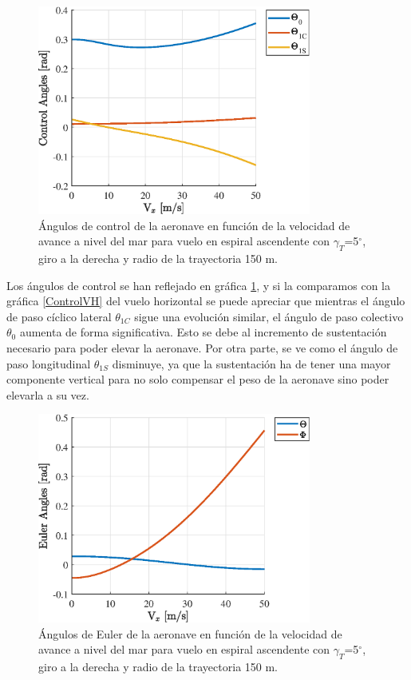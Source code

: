 \begin{figure}
	\centering
	\includegraphics[width=90mm]{graficos/ControlVE}
	\caption{Ángulos de control de la aeronave en función de la velocidad de avance a nivel del mar para vuelo en espiral ascendente con $\gamma_T$=5$^\circ$, giro a la derecha y radio de la trayectoria 150 m.}
	\label{ControlVE}
\end{figure}

Los ángulos de control se han reflejado en gráfica \ref{ControlVE}, y si la comparamos con la gráfica \ref{ControlVH} del vuelo horizontal se puede apreciar que mientras el ángulo de paso cíclico lateral $\theta_{1C}$ sigue una evolución similar, el ángulo de paso colectivo $\theta_0$ aumenta de forma significativa. Esto se debe al incremento de sustentación necesario para poder elevar la aeronave. Por otra parte, se ve como el ángulo de paso longitudinal $\theta_{1S}$ disminuye, ya que la sustentación ha de tener una mayor componente vertical para no solo compensar el peso de la aeronave sino poder elevarla a su vez.

\begin{figure}
	\centering
	\includegraphics[width=90mm]{graficos/EulerVE}
	\caption{Ángulos de Euler de la aeronave en función de la velocidad de avance a nivel del mar para vuelo en espiral ascendente con $\gamma_T$=5$^\circ$, giro a la derecha y radio de la trayectoria 150 m.}
	\label{EulerVE}
\end{figure}

